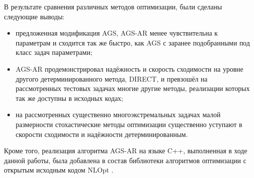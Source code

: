 В результате сравнения различных методов оптимизации, были сделаны следующие выводы:
\begin{itemize}
  \item предложенная модификация AGS, AGS-AR менее чувствительна к параметрам и сходится так же быстро, как AGS
  с заранее подобранными под класс задач параметрами;
  \item AGS-AR продемонстрировал надёжность и скорость сходимости на уровне другого детерминированного метода, DIRECT,
  и превзошёл на рассмотренных тестовых задачах многие другие методы, реализации которых так же доступны в исходных кодах;
  \item на рассмотренных существенно многоэкстремальных задачах малой размерности стохастические методы оптимизации
  существенно уступают в скорости сходимости и надёжности детерминированным.
\end{itemize}

Кроме того, реализация алгоритма AGS-AR на языке C++, выполненная в ходе данной работы, была добавлена в состав библиотеки
алгоритмов оптимизации с открытым исходным кодом NLOpt \cite{nlopt}.
